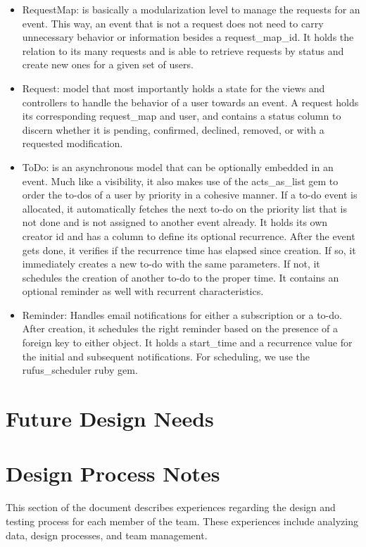 \documentclass[11pt]{article}
\begin{document}
\begin{itemize}
  \item RequestMap: is basically a modularization level to manage the requests for an event. This way, an event that is not a request does not need to carry unnecessary behavior or information besides a request\_map\_id. It holds the relation to its many requests and is able to retrieve requests by status and create new ones for a given set of users.
  \item Request: model that most importantly holds a state for the views and controllers to handle the behavior of a user towards an event. A request holds its corresponding request\_map and user, and contains a status column to discern whether it is pending, confirmed, declined, removed, or with a requested modification.
  \item ToDo: is an asynchronous model that can be optionally embedded in an event. Much like a visibility, it also makes use of the acts\_as\_list gem to order the to-dos of a user by priority in a cohesive manner. If a to-do event is allocated, it automatically fetches the next to-do on the priority list that is not done and is not assigned to another event already. It holds its own creator id and has a column to define its optional recurrence. After the event gets done, it verifies if the recurrence time has elapsed since creation. If so, it immediately creates a new to-do with the same parameters. If not, it schedules the creation of another to-do to the proper time. It contains an optional reminder as well with recurrent characteristics.
  \item Reminder: Handles email notifications for either a subscription or a to-do. After creation, it schedules the right reminder based on the presence of a foreign key to either object. It holds a start\_time and a recurrence value for the initial and subsequent notifications. For scheduling, we use the rufus\_scheduler ruby gem.

\end{itemize}

\section{Future Design Needs}

\section{Design Process Notes}

This section of the document describes experiences regarding the design and testing process for each member of the team.  These experiences include analyzing data, design processes, and team management.
\end{document}
